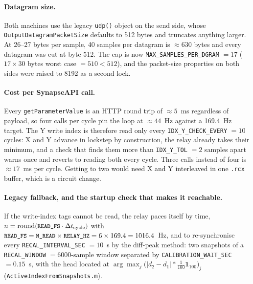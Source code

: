\documentclass[11pt,a4paper]{article}
\newcommand{\code}[1]{\texttt{\small #1}}
\newcommand{\file}[1]{\texttt{\small #1}}
\begin{document}
\paragraph{Datagram size.} Both machines use the legacy \code{udp()} object on
the send side, whose \code{OutputDatagramPacketSize} defaults to 512 bytes and
truncates anything larger. At 26--27 bytes per sample, 40 samples per datagram
is $\approx 630$ bytes and every datagram was cut at byte 512. The cap is now
\code{MAX\_SAMPLES\_PER\_DGRAM} $= 17$ ($17 \times 30$ bytes worst case
$= 510 < 512$), and the packet-size properties on both sides were raised to
8192 as a second lock.

\paragraph{Cost per SynapseAPI call.} Every \code{getParameterValue} is an HTTP
round trip of $\approx 5$~ms regardless of payload, so four calls per cycle pin
the loop at $\approx 44$~Hz against a 169.4~Hz target. The Y write index is
therefore read only every \code{IDX\_Y\_CHECK\_EVERY} $= 10$ cycles: X and Y
advance in lockstep by construction, the relay already takes their minimum, and
a check that finds them more than \code{IDX\_Y\_TOL} $= 2$ samples apart warns
once and reverts to reading both every cycle. Three calls instead of four is
$\approx 17$~ms per cycle. Getting to two would need X and Y interleaved in one
\code{.rcx} buffer, which is a circuit change.

\paragraph{Legacy fallback, and the startup check that makes it reachable.} If
the write-index tags cannot be read, the relay paces itself by time,
$n = \operatorname{round}(\code{READ\_FS} \cdot \Delta t_{\text{cycle}})$ with
$\code{READ\_FS} = \code{N\_READ} \times \code{RELAY\_HZ} = 6 \times 169.4 =
1016.4$~Hz, and to re-synchronise every \code{RECAL\_INTERVAL\_SEC} $= 10$~s by
the diff-peak method: two snapshots of a \code{RECAL\_WINDOW} $= 6000$-sample
window separated by \code{CALIBRATION\_WAIT\_SEC} $= 0.15$~s, with the head
located at $\arg\max_j \big(|d_2 - d_1| * \tfrac{1}{100}\bm{1}_{100}\big)_j$
(\file{ActiveIndexFromSnapshots.m}).
\end{document}
